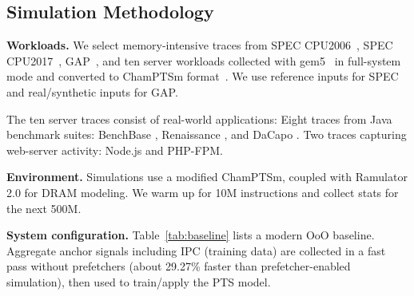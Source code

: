 \documentclass[conference]{IEEEtran}
\begin{document}
\subsection{Simulation Methodology}
\label{subsec:expsetup}
\textbf{Workloads.} We select memory-intensive traces from SPEC CPU2006~\cite{spec2006}, SPEC CPU2017~\cite{spec2017}, GAP~\cite{beamer2017gapbenchmarksuite}, and ten server workloads collected with gem5~\cite{gem52011} in full-system mode and converted to ChamPTSm format~\cite{llbp_workloads}. We use reference inputs for SPEC and real/synthetic inputs for GAP.

The ten server traces consist of real-world applications: Eight traces from Java benchmark suites: BenchBase \cite{oltp_bench}, Renaissance \cite{java_renaissance}, and DaCapo \cite{java_dacapo}. Two traces capturing web-server activity: Node.js and PHP-FPM.

\textbf{Environment.} Simulations use a modified ChamPTSm\cite{chamPTSm}, coupled with Ramulator 2.0\cite{luo2023ramulator20modernmodular} for DRAM modeling. We warm up for 10M instructions and collect stats for the next 500M.

\textbf{System configuration.} Table~\ref{tab:baseline} lists a modern OoO baseline. Aggregate anchor signals including IPC (training data) are collected in a fast pass without prefetchers (about 29.27\% faster than prefetcher-enabled simulation), then used to train/apply the PTS model.
\end{document}
